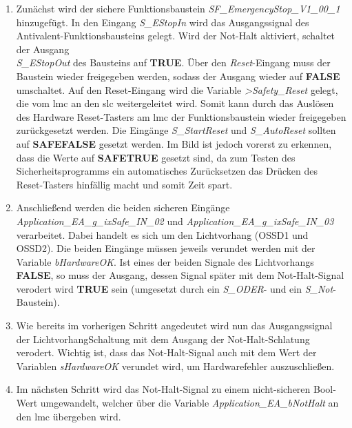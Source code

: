 \documentclass[../../../Bachelorarbeit.tex]{subfiles}
\begin{document}
\begin{enumerate}
\begin{minipage}[t]{\linewidth}
        \label{fig:my-img43}
    \end{minipage}
    \item Zunächst wird der sichere Funktionsbaustein \textit{SF\_EmergencyStop\_V1\_00\_1} hinzugefügt. In den Eingang \textit{S\_EStopIn} wird das Ausgangssignal des Antivalent-Funktionsbausteins gelegt. Wird der Not-Halt aktiviert, schaltet der Ausgang \\ \textit{S\_EStopOut} des Bausteins auf \textbf{TRUE}. Über den \textit{Reset}-Eingang muss der Baustein wieder freigegeben werden, sodass der Ausgang wieder auf \textbf{FALSE} umschaltet. Auf den Reset-Eingang wird die Variable \textit{>Safety\_Reset} gelegt, die vom \acs{lmc} an den \acs{slc} weitergeleitet wird. Somit kann durch das Auslösen des Hardware Reset-Tasters am \acs{lmc} der Funktionsbaustein wieder freigegeben \bzw zurückgesetzt werden. Die Eingänge \textit{S\_StartReset} und \textit{S\_AutoReset} sollten auf \textbf{SAFEFALSE} gesetzt werden. Im Bild ist jedoch vorerst zu erkennen, dass die Werte auf \textbf{SAFETRUE} gesetzt sind, da zum Testen des Sicherheitsprogramms ein automatisches Zurücksetzen das Drücken des Reset-Tasters hinfällig macht und somit Zeit spart.
    \item Anschließend werden die beiden sicheren Eingänge \textit{Application\_EA\_g\_ixSafe\_IN\_02} und \textit{Application\_EA\_g\_ixSafe\_IN\_03} verarbeitet. Dabei handelt es sich um den Lichtvorhang (OSSD1 und OSSD2). Die beiden Eingänge müssen jeweils verundet werden mit der Variable \textit{bHardwareOK}. Ist eines der beiden Signale des Lichtvorhangs \textbf{FALSE}, so muss der Ausgang, dessen Signal später mit dem Not-Halt-Signal verodert wird \textbf{TRUE} sein (umgesetzt durch ein \textit{S\_ODER}- und ein \textit{S\_Not}-Baustein).
    \item Wie bereits im vorherigen Schritt angedeutet wird nun das Ausgangssignal der LichtvorhangSchaltung mit dem Ausgang der Not-Halt-Schlatung verodert. Wichtig ist, dass das Not-Halt-Signal auch mit dem Wert der Variablen \textit{sHardwareOK} verundet wird, um Hardwarefehler auszuschließen.
    \item Im nächsten Schritt wird das Not-Halt-Signal zu einem nicht-sicheren Bool-Wert umgewandelt, welcher über die Variable \textit{Application\_EA\_bNotHalt} an den \acs{lmc} übergeben wird.

\end{enumerate}
\end{document}
